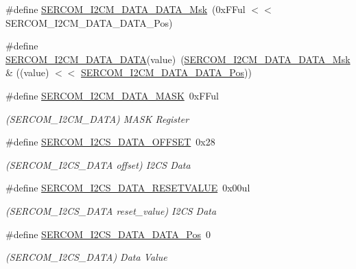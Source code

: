 \begin{DoxyCompactItemize}
\#define \mbox{\hyperlink{group___s_a_m_d21___s_e_r_c_o_m_gae18dae057d191410cbf2e3dfbffbc4af}{S\+E\+R\+C\+O\+M\+\_\+\+I2\+C\+M\+\_\+\+D\+A\+T\+A\+\_\+\+D\+A\+T\+A\+\_\+\+Msk}}~(0x\+F\+Ful $<$$<$ S\+E\+R\+C\+O\+M\+\_\+\+I2\+C\+M\+\_\+\+D\+A\+T\+A\+\_\+\+D\+A\+T\+A\+\_\+\+Pos)
\item 
\#define \mbox{\hyperlink{group___s_a_m_d21___s_e_r_c_o_m_gab0d783170ee4fd96243093236096d1f2}{S\+E\+R\+C\+O\+M\+\_\+\+I2\+C\+M\+\_\+\+D\+A\+T\+A\+\_\+\+D\+A\+TA}}(value)~(\mbox{\hyperlink{group___s_a_m_d21___s_e_r_c_o_m_gae18dae057d191410cbf2e3dfbffbc4af}{S\+E\+R\+C\+O\+M\+\_\+\+I2\+C\+M\+\_\+\+D\+A\+T\+A\+\_\+\+D\+A\+T\+A\+\_\+\+Msk}} \& ((value) $<$$<$ \mbox{\hyperlink{group___s_a_m_d21___s_e_r_c_o_m_ga5d492a7a17f6ef63c189c8fd0703bee4}{S\+E\+R\+C\+O\+M\+\_\+\+I2\+C\+M\+\_\+\+D\+A\+T\+A\+\_\+\+D\+A\+T\+A\+\_\+\+Pos}}))
\item 
\#define \mbox{\hyperlink{group___s_a_m_d21___s_e_r_c_o_m_ga1b14f82c6aa82236cf7e5a23568e5cec}{S\+E\+R\+C\+O\+M\+\_\+\+I2\+C\+M\+\_\+\+D\+A\+T\+A\+\_\+\+M\+A\+SK}}~0x\+F\+Ful
\begin{DoxyCompactList}\small\item\em (S\+E\+R\+C\+O\+M\+\_\+\+I2\+C\+M\+\_\+\+D\+A\+TA) M\+A\+SK Register \end{DoxyCompactList}\item 
\#define \mbox{\hyperlink{group___s_a_m_d21___s_e_r_c_o_m_gabd04fb358adbdac19719136b912c6561}{S\+E\+R\+C\+O\+M\+\_\+\+I2\+C\+S\+\_\+\+D\+A\+T\+A\+\_\+\+O\+F\+F\+S\+ET}}~0x28
\begin{DoxyCompactList}\small\item\em (S\+E\+R\+C\+O\+M\+\_\+\+I2\+C\+S\+\_\+\+D\+A\+TA offset) I2\+CS Data \end{DoxyCompactList}\item 
\#define \mbox{\hyperlink{group___s_a_m_d21___s_e_r_c_o_m_ga667ef55882b091a9aa4e0bff1dae0fd9}{S\+E\+R\+C\+O\+M\+\_\+\+I2\+C\+S\+\_\+\+D\+A\+T\+A\+\_\+\+R\+E\+S\+E\+T\+V\+A\+L\+UE}}~0x00ul
\begin{DoxyCompactList}\small\item\em (S\+E\+R\+C\+O\+M\+\_\+\+I2\+C\+S\+\_\+\+D\+A\+TA reset\+\_\+value) I2\+CS Data \end{DoxyCompactList}\item 
\#define \mbox{\hyperlink{group___s_a_m_d21___s_e_r_c_o_m_ga12ba9b88b0fe76770dd6a570d48e1f8b}{S\+E\+R\+C\+O\+M\+\_\+\+I2\+C\+S\+\_\+\+D\+A\+T\+A\+\_\+\+D\+A\+T\+A\+\_\+\+Pos}}~0
\begin{DoxyCompactList}\small\item\em (S\+E\+R\+C\+O\+M\+\_\+\+I2\+C\+S\+\_\+\+D\+A\+TA) Data Value \end{DoxyCompactList}\item 

\end{DoxyCompactItemize}
